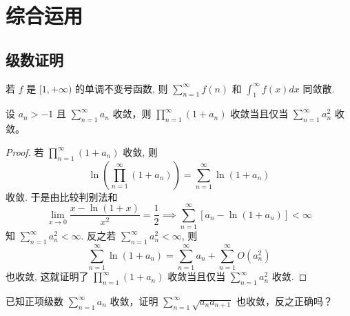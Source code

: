 \documentclass[lang=cn,10pt,thmcnt=section]{elegantbook}
\begin{document}
\section{综合运用}
\subsection{级数证明}
\begin{theorem}[积分判别法]
	若 $f$ 是 $[1, +\infty)$ 的单调不变号函数, 则 $\displaystyle\sum_{n=1}^\infty f(n)$ 和 $\displaystyle\int_1^\infty f(x)dx$ 同敛散.
	\end{theorem}
	
\begin{example}
	设 $a_n > -1$ 且 $\sum_{n=1}^{\infty} a_n$ 收敛，则 $\prod_{n=1}^{\infty} (1 + a_n)$ 收敛当且仅当 $\sum_{n=1}^{\infty} a_n^2$ 收敛。
	\end{example}
	\begin{proof}
		若 $\displaystyle\prod_{n=1}^\infty (1+a_n)$ 收敛, 则
\[
\ln\left(\prod_{n=1}^\infty (1+a_n)\right) = \sum_{n=1}^\infty \ln(1+a_n)
\]
收敛. 于是由比较判别法和
\[
\lim_{x\to 0} \frac{x - \ln(1+x)}{x^2} = \frac{1}{2} \implies \sum_{n=1}^\infty [a_n - \ln(1+a_n)] < \infty
\]
知 $\displaystyle\sum_{n=1}^\infty a_n^2 < \infty$. 反之若 $\displaystyle\sum_{n=1}^\infty a_n^2 < \infty$, 则
\[
\sum_{n=1}^\infty \ln(1+a_n) = \sum_{n=1}^\infty a_n + \sum_{n=1}^\infty O(a_n^2)
\]
也收敛, 这就证明了 $\displaystyle\prod_{n=1}^\infty (1+a_n)$ 收敛当且仅当 $\displaystyle\sum_{n=1}^\infty a_n^2$ 收敛.

	\end{proof}
	\begin{example}
	已知正项级数 $\sum_{n=1}^{\infty} a_n$ 收敛，证明 $\sum_{n=1}^{\infty} \sqrt{a_n a_{n+1}}$ 也收敛，反之正确吗？
	\end{example}
	
\end{document}
